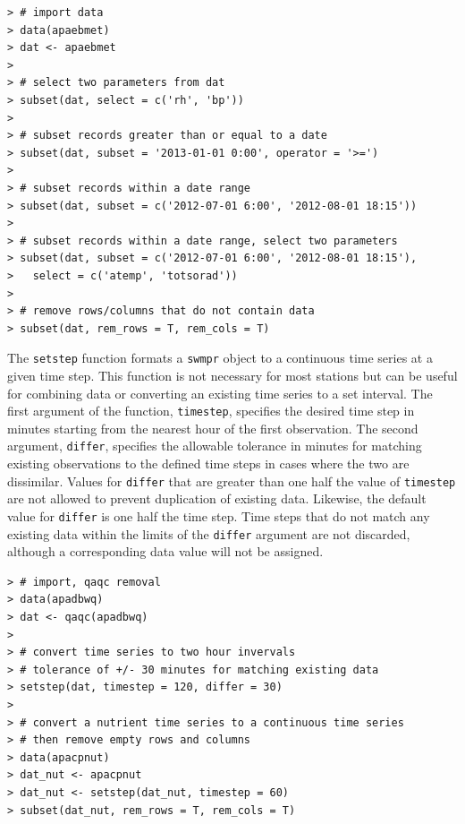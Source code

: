 \documentclass[10pt,letterpaper]{article}\usepackage[]{graphicx}\usepackage[]{color}
\makeatletter
\newenvironment{kframe}{%
 \def\at@end@of@kframe{}%
 \ifinner\ifhmode%
  \def\at@end@of@kframe{\end{minipage}}%
  \begin{minipage}{\columnwidth}%
 \fi\fi%
 \def\FrameCommand##1{\hskip\@totalleftmargin \hskip-\fboxsep
 \colorbox{shadecolor}{##1}\hskip-\fboxsep
     \hskip-\linewidth \hskip-\@totalleftmargin \hskip\columnwidth}%
 \MakeFramed {\advance\hsize-\width
   \@totalleftmargin\z@ \linewidth\hsize
   \@setminipage}}%
 {\par\unskip\endMakeFramed%
 \at@end@of@kframe}
\newenvironment{knitrout}{}{} %
\makeatother
\begin{document}
\begin{knitrout}
\color{fgcolor}\begin{kframe}
\begin{verbatim}
> # import data
> data(apaebmet)
> dat <- apaebmet
> 
> # select two parameters from dat
> subset(dat, select = c('rh', 'bp'))
> 
> # subset records greater than or equal to a date
> subset(dat, subset = '2013-01-01 0:00', operator = '>=')
> 
> # subset records within a date range
> subset(dat, subset = c('2012-07-01 6:00', '2012-08-01 18:15'))
> 
> # subset records within a date range, select two parameters
> subset(dat, subset = c('2012-07-01 6:00', '2012-08-01 18:15'),
>   select = c('atemp', 'totsorad'))
> 
> # remove rows/columns that do not contain data
> subset(dat, rem_rows = T, rem_cols = T)
\end{verbatim}
\end{kframe}
\end{knitrout}

The \texttt{setstep} function formats a \texttt{swmpr} object to a continuous time series at a given time step.  This function is not necessary for most stations but can be useful for combining data or converting an existing time series to a set interval.  The first argument of the function, \texttt{timestep}, specifies the desired time step in minutes starting from the nearest hour of the first observation.  The second argument, \texttt{differ}, specifies the allowable tolerance in minutes for matching existing observations to the defined time steps in cases where the two are dissimilar.  Values for \texttt{differ} that are greater than one half the value of \texttt{timestep} are not allowed to prevent duplication of existing data.  Likewise, the default value for \texttt{differ} is one half the time step.  Time steps that do not match any existing data within the limits of the \texttt{differ} argument are not discarded, although a corresponding data value will not be assigned.

\begin{knitrout}
\color{fgcolor}\begin{kframe}
\begin{verbatim}
> # import, qaqc removal
> data(apadbwq)
> dat <- qaqc(apadbwq)
> 
> # convert time series to two hour invervals
> # tolerance of +/- 30 minutes for matching existing data
> setstep(dat, timestep = 120, differ = 30)
> 
> # convert a nutrient time series to a continuous time series
> # then remove empty rows and columns
> data(apacpnut)
> dat_nut <- apacpnut
> dat_nut <- setstep(dat_nut, timestep = 60)
> subset(dat_nut, rem_rows = T, rem_cols = T)
\end{verbatim}
\end{kframe}
\end{knitrout}
\end{document}
